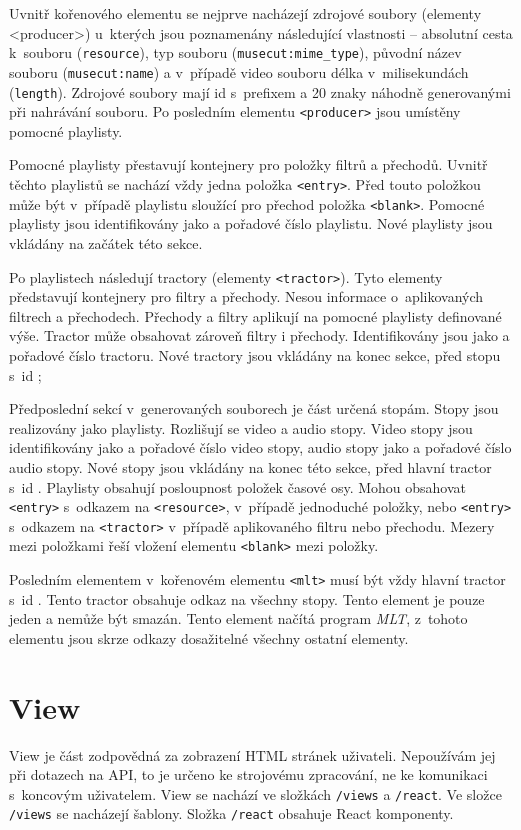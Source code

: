 Uvnitř kořenového elementu se nejprve  nacházejí zdrojové soubory (elementy <producer>) u~kterých jsou poznamenány následující vlastnosti -- absolutní cesta k~souboru (\texttt{resource}), typ souboru (\texttt{musecut:mime\_type}), původní název souboru (\texttt{musecut:name}) a v~případě video souboru délka v~milisekundách (\texttt{length}). Zdrojové soubory mají id s~prefixem  a 20 znaky náhodně generovanými při nahrávání souboru.
Po posledním elementu \texttt{<producer>} jsou umístěny pomocné playlisty.

Pomocné playlisty přestavují kontejnery pro položky filtrů a přechodů. Uvnitř těchto playlistů se nachází vždy jedna položka \texttt{<entry>}. Před touto položkou může být v~případě playlistu sloužící pro přechod položka \texttt{<blank>}. Pomocné playlisty jsou identifikovány jako  a pořadové číslo playlistu. Nové playlisty jsou vkládány na začátek této sekce.

Po playlistech následují tractory (elementy \texttt{<tractor>}). Tyto elementy představují kontejnery pro filtry a přechody. Nesou informace o~aplikovaných filtrech a přechodech. Přechody a filtry aplikují na pomocné playlisty definované výše. Tractor může obsahovat zároveň filtry i přechody. Identifikovány jsou jako  a pořadové číslo tractoru. Nové tractory jsou vkládány na konec sekce, před stopu s~id ;

Předposlední sekcí v~generovaných souborech je část určená stopám. Stopy jsou realizovány jako playlisty. Rozlišují se video a audio stopy. Video stopy jsou identifikovány jako  a pořadové číslo video stopy, audio stopy jako  a pořadové číslo audio stopy. Nové stopy jsou vkládány na konec této sekce, před hlavní tractor s~id . Playlisty obsahují posloupnost položek časové osy. Mohou obsahovat \texttt{<entry>} s~odkazem na \texttt{<resource>}, v~případě jednoduché položky, nebo \texttt{<entry>} s~odkazem na \texttt{<tractor>} v~případě aplikovaného filtru nebo přechodu. Mezery mezi položkami řeší vložení elementu \texttt{<blank>} mezi položky.

Posledním elementem v~kořenovém elementu \texttt{<mlt>} musí být vždy hlavní tractor s~id . Tento tractor obsahuje odkaz na všechny stopy. Tento element je pouze jeden a nemůže být smazán. Tento element načítá program \textit{MLT}, z~tohoto elementu jsou skrze odkazy dosažitelné všechny ostatní elementy.

\section{View}
View je část zodpovědná za zobrazení HTML stránek uživateli. Nepoužívám jej při dotazech na API, to je určeno ke strojovému zpracování, ne ke komunikaci s~koncovým uživatelem. View se nachází ve složkách \texttt{/views} a \texttt{/react}. Ve složce \texttt{/views} se nacházejí šablony. Složka \texttt{/react} obsahuje React komponenty.

